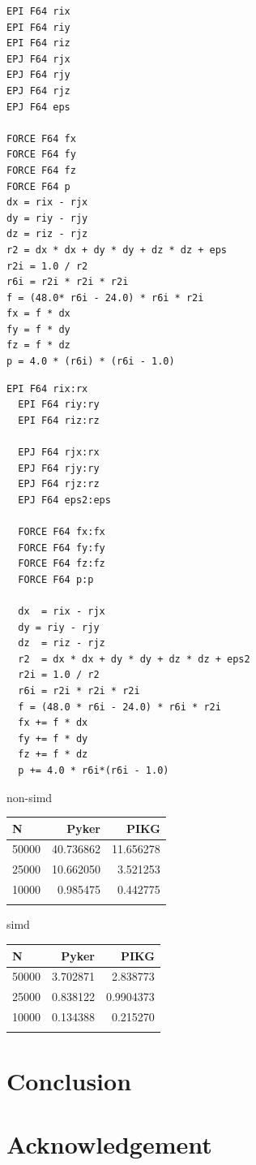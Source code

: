 \documentclass[ams, a4j]{U-AizuGT}
\begin{document}
\begin{lstlisting}[frame=single, caption=LennardJones-kernel.pyker, label=LennardJones-kernel.pyker]
EPI F64 rix
EPI F64 riy
EPI F64 riz
EPJ F64 rjx
EPJ F64 rjy
EPJ F64 rjz
EPJ F64 eps

FORCE F64 fx
FORCE F64 fy
FORCE F64 fz
FORCE F64 p
dx = rix - rjx
dy = riy - rjy
dz = riz - rjz
r2 = dx * dx + dy * dy + dz * dz + eps
r2i = 1.0 / r2
r6i = r2i * r2i * r2i
f = (48.0* r6i - 24.0) * r6i * r2i
fx = f * dx
fy = f * dy
fz = f * dz
p = 4.0 * (r6i) * (r6i - 1.0)
\end{lstlisting}
\begin{lstlisting}[frame=single, caption=LennardJones-kernel.pyker, label=LennardJones-kernel.pyker]
  EPI F64 rix:rx
  EPI F64 riy:ry
  EPI F64 riz:rz
  
  EPJ F64 rjx:rx
  EPJ F64 rjy:ry
  EPJ F64 rjz:rz
  EPJ F64 eps2:eps
  
  FORCE F64 fx:fx
  FORCE F64 fy:fy
  FORCE F64 fz:fz
  FORCE F64 p:p
  
  dx  = rix - rjx
  dy = riy - rjy
  dz  = riz - rjz
  r2  = dx * dx + dy * dy + dz * dz + eps2
  r2i = 1.0 / r2
  r6i = r2i * r2i * r2i
  f = (48.0 * r6i - 24.0) * r6i * r2i
  fx += f * dx
  fy += f * dy
  fz += f * dz
  p += 4.0 * r6i*(r6i - 1.0)

\end{lstlisting}


non-simd
\begin{tabular}{|l|r|r|} \hline
  N & Pyker & PIKG \\ \hline
  50000 & 40.736862 & 11.656278 \\
  25000 & 10.662050 & 3.521253 \\
  10000 & 0.985475 & 0.442775 \\
 \\ \hline
\end{tabular}


simd
\begin{tabular}{|l|r|r|} \hline
  N & Pyker & PIKG \\ \hline
  50000 & 3.702871  & 2.838773\\
  25000 & 0.838122 & 0.9904373 \\
  10000 & 0.134388 & 0.215270 \\

 \\ \hline
\end{tabular}



\section{Conclusion}
\section{Acknowledgement}

\end{document}
